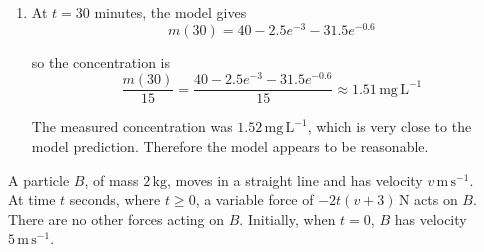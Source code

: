 \documentclass[leqno]{article}
\begin{document}
\begin{enumerate}[
  label=\textbf{\arabic*.},
  leftmargin=*,
  topsep=0pt,
  partopsep=0pt,
  parsep=0pt
]
\begin{djsSolution}
\begin{enumerate}[label=\textbf{(\alph*)}]
  Integrating both sides with respect to $t$:
  \begin{align*}
  me^{t/50}
  &=\int 0.8e^{t/50}\, \mathrm{d}t+\int 0.2e^{-0.08t}\, \mathrm{d}t+c \\
  &=0.8(50)e^{t/50}+0.2\left(\frac{1}{-0.08}\right)e^{-0.08t}+c \\
  &=40e^{t/50}-2.5e^{-0.08t}+c
  \end{align*}

  Divide through by $e^{t/50}$:
  \begin{align*}
  m
  &=40-2.5e^{-0.08t}e^{-t/50}+ce^{-t/50} \\
  &=40-2.5e^{-0.1t}+ce^{-0.02t}
  \end{align*}

  Initially there are $6\,\mathrm{mg}$ of dye in the tank, so $m(0)=6$. Substituting $t=0$ gives
  \begin{align*}
  6&=40-2.5+c \\
  6&=37.5+c \\
  c&=-31.5
  \end{align*}

  Therefore
  \[
  m=40-2.5e^{-0.1t}-31.5e^{-0.02t}
  \]

  \item At $t=30$ minutes, the model gives
  \[
  m(30)=40-2.5e^{-3}-31.5e^{-0.6}
  \]

  so the concentration is
  \[
  \frac{m(30)}{15}=\frac{40-2.5e^{-3}-31.5e^{-0.6}}{15}\approx 1.51\,\mathrm{mg\,L}^{-1}
  \]

  The measured concentration was $1.52\,\mathrm{mg\,L}^{-1}$, which is very close to the model prediction. Therefore the model appears to be reasonable.
\end{enumerate}
\end{djsSolution}


\newpage

\questionitem

A particle $B$, of mass $2\,\mathrm{kg}$, moves in a straight line and has velocity $v\,\mathrm{m\,s^{-1}}$. \\

At time $t$ seconds, where $t\ge 0$, a variable force of $-2t(v+3)\,\mathrm{N}$ acts on $B$. There are no other forces acting on $B$. Initially, when $t=0$, $B$ has velocity $5\,\mathrm{m\,s^{-1}}$. \\


\end{enumerate}
\end{document}
